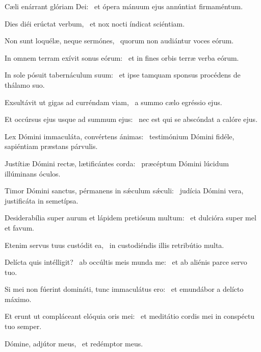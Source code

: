 \item Cæli enárrant glóriam Dei:~\psstar{} et ópera mánuum ejus annúntiat firmaméntum.

\item Dies diéi erúctat verbum,~\psstar{} et nox nocti índicat sciéntiam.

\item Non sunt loquélæ, neque sermónes,~\psstar{} quorum non audiántur voces eórum.

\item In omnem terram exívit sonus eórum:~\psstar{} et in fines orbis terræ verba eórum.

\item In sole pósuit tabernáculum suum:~\psstar{} et ipse tamquam sponsus procédens de thálamo suo.

\item Exsultávit ut gigas ad curréndam viam,~\psstar{} a summo cælo egréssio ejus.

\item Et occúrsus ejus usque ad summum ejus:~\psstar{} nec est qui se abscóndat a calóre ejus.

\item Lex Dómini immaculáta, convértens ánimas:~\psstar{} testimónium Dómini fidéle, sapiéntiam præstans párvulis.

\item Justítiæ Dómini rectæ, lætificántes corda:~\psstar{} præcéptum Dómini lúcidum illúminans óculos.

\item Timor Dómini sanctus, pérmanens in sǽculum sǽculi:~\psstar{} judícia Dómini vera, justificáta in semetípsa.

\item Desiderabília super aurum et lápidem pretiósum multum:~\psstar{} et dulcióra super mel et favum.

\item Etenim servus tuus custódit ea,~\psstar{} in custodiéndis illis retribútio multa.

\item Delícta quis intélligit?~\pscross{} ab occúltis meis munda me:~\psstar{} et ab aliénis parce servo tuo.

\item Si mei non fúerint domináti, tunc immaculátus ero:~\psstar{} et emundábor a delícto máximo.

\item Et erunt ut compláceant elóquia oris mei:~\psstar{} et meditátio cordis mei in conspéctu tuo semper.

\item Dómine, adjútor meus,~\psstar{} et redémptor meus.
